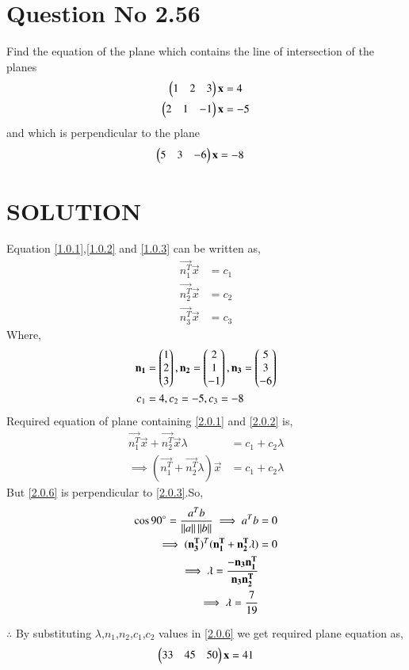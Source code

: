 \documentclass[journal,12pt,twocolumn]{IEEEtran}
\begin{document}
\section{Question No 2.56}
Find the equation of the plane which contains the line of intersection of the planes 
%
\begin{align}
\begin{pmatrix}1 & 2 & 3\end{pmatrix}\mathbf{x}&=4 \label{1.0.1}
\\
\begin{pmatrix}2 & 1 & -1\end{pmatrix}\mathbf{x}&=-5 \label{1.0.2}
\end{align}
%
and which is perpendicular to the plane 
\begin{align}
\begin{pmatrix}5 & 3 & -6\end{pmatrix}\mathbf{x}&=-8 \label{1.0.3}
\end{align} 
\section{SOLUTION} 
Equation \eqref{1.0.1},\eqref{1.0.2} and \eqref{1.0.3} can be written as,
\begin{align}
\vec{n_1^T}\vec{x} &= c_1 \label{2.0.1}\\
\vec{n_2^T}\vec{x} &= c_2 \label{2.0.2}\\
\vec{n_3^T}\vec{x} &= c_3 \label{2.0.3}
\end{align}
Where,
\begin{align}
\mathbf{n_1}&=\begin{pmatrix}1 \\ 2 \\ 3\end{pmatrix},\mathbf{n_2}=\begin{pmatrix}2 \\ 1 \\ -1\end{pmatrix},\mathbf{n_3}=\begin{pmatrix}5 \\ 3 \\ -6\end{pmatrix}\nonumber \\
c_1&=4,c_2=-5,c_3=-8
\end{align}
Required equation of plane containing \eqref{2.0.1} and \eqref{2.0.2} is,
\begin{align}
\vec{n_1^T}\vec{x} + \vec{n_2^T}\vec{x} \lambda &= c_1+c_2 \lambda \\
\implies (\vec{n_1^T}+\vec{n_2^T} \lambda)\vec{x} &= c_1+c_2 \lambda \label{2.0.6}
\end{align}
But \eqref{2.0.6} is perpendicular to \eqref{2.0.3}.So,
\begin{align}
\cos 90\degree = \frac{a^T b}{\left\lVert a\right\rVert\left\lVert b\right\rVert}
\implies a^T b &= 0 \\
\implies(\mathbf{n_3^T})^T(\mathbf{n_1^T}+\mathbf{n_2^T} \lambda)&=0\\
\implies \lambda = \frac{-\mathbf{n_3}\mathbf{n_1^T}}{\mathbf{n_3}\mathbf{n_2^T}}\\
\implies\lambda = \frac{7}{19}
\end{align}

$\therefore $ By substituting $\lambda$,$n_1$,$n_2$,$c_1$,$c_2$ values in \eqref{2.0.6} we get required plane equation as,
\begin{align}
\begin{pmatrix}33 & 45 & 50\end{pmatrix}\mathbf{x} = 41 
\end{align}
\end{document}

